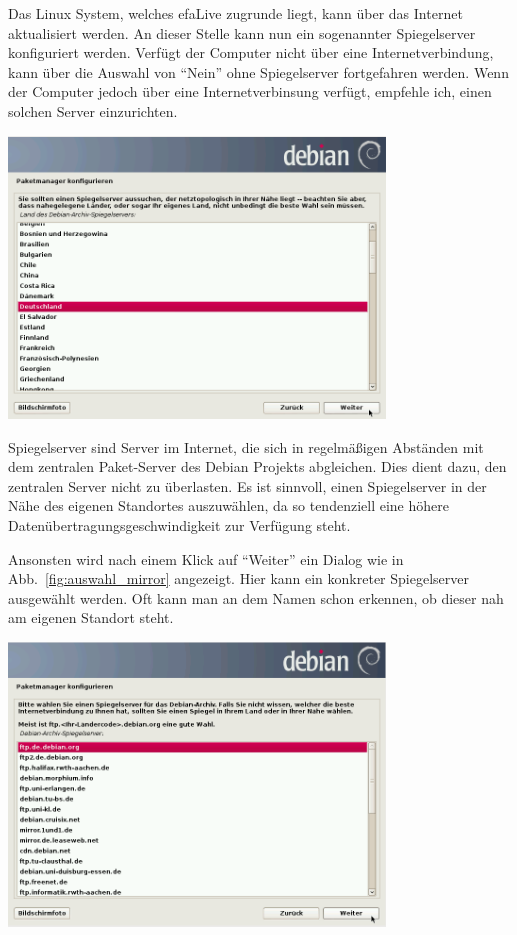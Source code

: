 \documentclass[a4paper,12pt,twoside]{article}
\begin{document}
Das Linux System, welches efaLive zugrunde liegt, kann über das Internet
aktualisiert werden. An dieser Stelle kann nun ein sogenannter
Spiegelserver konfiguriert werden. Verfügt der Computer nicht über eine
Internetverbindung, kann über die Auswahl von
"`Nein"' ohne Spiegelserver fortgefahren
werden. Wenn der Computer jedoch über eine Internetverbinsung verfügt,
empfehle ich, einen solchen Server einzurichten.

\begin{minipage}{\linewidth}
    \centering
    \includegraphics[width=10cm]{efaLivede-img/efaLivede-img14.png}
    \label{fig:mirror_region}
\end{minipage}

Spiegelserver sind Server im Internet, die sich in regelmäßigen
Abständen mit dem zentralen Paket-Server des Debian Projekts
abgleichen. Dies dient dazu, den zentralen Server nicht zu überlasten.
Es ist sinnvoll, einen Spiegelserver in der Nähe des eigenen Standortes
auszuwählen, da so tendenziell eine höhere
Datenübertragungsgeschwindigkeit zur Verfügung steht.

Ansonsten wird nach einem Klick auf "`Weiter"'
ein Dialog wie in Abb.~\ref{fig:auswahl_mirror} angezeigt. Hier kann ein
konkreter Spiegelserver ausgewählt werden. Oft kann man an dem Namen
schon erkennen, ob dieser nah am eigenen Standort steht.

\begin{minipage}{\linewidth}
    \centering
    \includegraphics[width=10cm]{efaLivede-img/efaLivede-img15.png}
    \label{fig:auswahl_mirror}
\end{minipage}
\end{document}
